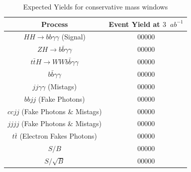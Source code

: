 \documentclass{cmspaper}
\begin{document}
\begin{table}[!ht]
\begin{center} 
\begin{tabular}{|c|c|}
\hline 
Process                                              &  Event Yield at $3$~$ab^{-1}$ \\  \hline
$HH \rightarrow bb\gamma\gamma$ (Signal)             &  00000                     \\  \hline
$ZH \rightarrow b\bar{b}\gamma\gamma$                &  00000                     \\  
$t\bar{t}H \rightarrow W W b \bar{b}\gamma\gamma$    &  00000                     \\  \hline
$b \bar{b} \gamma\gamma$                             &  00000                     \\  
$jj \gamma\gamma$ (Mistags)                          &  00000                     \\  
$bb jj$ (Fake Photons)                               &  00000                     \\  
$cc jj$ (Fake Photons \& Mistags)                    &  00000                     \\  
$jjjj$  (Fake Photons \& Mistags)                    &  00000                     \\  \hline
$t\bar{t}$ (Electron Fakes Photons)                  &  00000                     \\  \hline
\hline
$S/B$                                                &  00000                     \\  \hline
$S/\sqrt{B}$                                         &  00000                     \\  \hline

\end{tabular}
\caption{Expected Yields for conservative mass windows }
\label{tab:EventYieldSummaryConservativeMassWindows}
\end{center}
\end{table}
 
\end{document}
